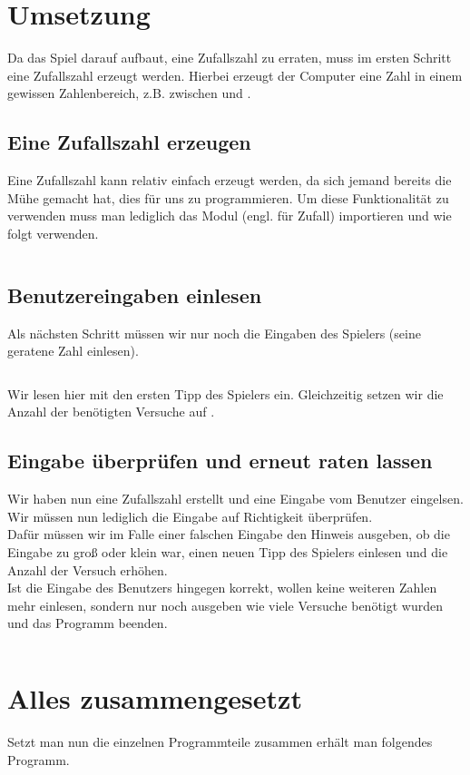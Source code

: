 \documentclass{\VorlagenPfad/coderdojokatext}
\begin{document}
\section{Umsetzung}
Da das Spiel darauf aufbaut, eine Zufallszahl zu erraten, muss im ersten Schritt eine Zufallszahl erzeugt werden. Hierbei erzeugt der Computer eine Zahl in einem gewissen Zahlenbereich, z.B. zwischen  und .

\subsection{Eine Zufallszahl erzeugen}
Eine Zufallszahl kann relativ einfach erzeugt werden, da sich jemand bereits die Mühe gemacht hat, dies für uns zu programmieren. Um diese Funktionalität zu verwenden muss man lediglich das Modul  (engl. für Zufall) importieren und wie folgt verwenden.

\inputminted[firstline=1, lastline=3, linenos]{python}{../../Beispiele/zahlen_raten.py}

\subsection{Benutzereingaben einlesen}
Als nächsten Schritt müssen wir nur noch die Eingaben des Spielers (seine geratene Zahl einlesen).

\inputminted[firstline=5, lastline=11, linenos]{python}{../../Beispiele/zahlen_raten.py}
Wir lesen hier mit  den ersten Tipp des Spielers ein. Gleichzeitig setzen wir die Anzahl der benötigten Versuche auf .

\subsection{Eingabe überprüfen und erneut raten lassen}
Wir haben nun eine Zufallszahl erstellt und eine Eingabe vom Benutzer eingelsen. Wir müssen nun lediglich die Eingabe auf Richtigkeit überprüfen.
\\Dafür müssen wir im Falle einer falschen Eingabe den Hinweis ausgeben, ob die Eingabe zu groß oder klein war, einen neuen Tipp des Spielers einlesen und die Anzahl der Versuch erhöhen.
\\Ist die Eingabe des Benutzers hingegen korrekt, wollen keine weiteren Zahlen mehr einlesen, sondern nur noch ausgeben wie viele Versuche benötigt wurden und das Programm beenden.
\inputminted[firstline=12, linenos]{python}{../../Beispiele/zahlen_raten.py}




\pagebreak
\section{Alles zusammengesetzt}
Setzt man nun die einzelnen Programmteile zusammen erhält man folgendes Programm.

\inputminted[linenos]{python}{../../Beispiele/zahlen_raten.py}
\end{document}
